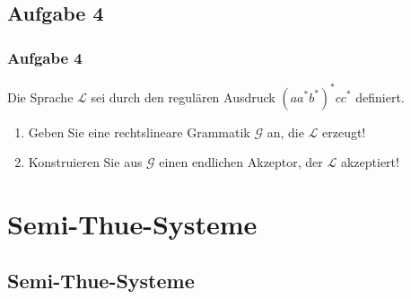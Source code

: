 \subsection{Aufgabe 4}
\begin{frame}
	\frametitle{Aufgabe 4}
	Die Sprache $\mathcal{L}$ sei durch den regulären Ausdruck $(aa^*b^*)^*cc^*$
	definiert.
	\begin{enumerate}
		\item Geben Sie eine rechtslineare Grammatik $\mathcal{G}$ an, die $\mathcal{L}$
		erzeugt!
		\item Konstruieren Sie aus $\mathcal{G}$ einen endlichen Akzeptor, der $\mathcal{L}$
	akzeptiert!
	\end{enumerate}
\end{frame}
\section{Semi-Thue-Systeme}
\subsection{Semi-Thue-Systeme}


